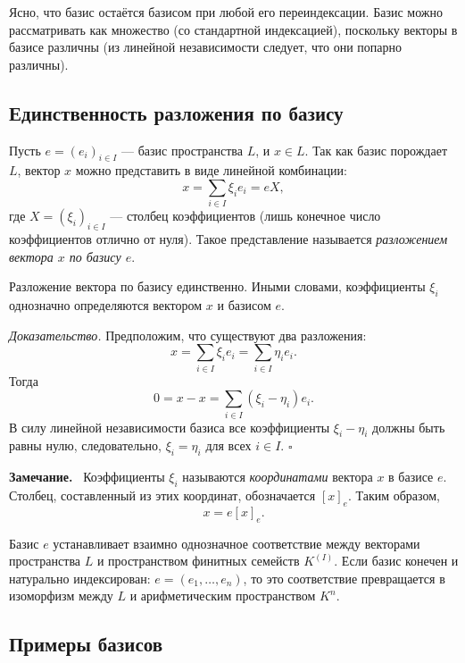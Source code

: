 \documentclass[a4paper,12pt]{article}
\newcommand{\myremark}{\textbf{Замечание.}\ }
\theoremstyle{definition}
\theoremstyle{plain}
\theoremstyle{remark}
\begin{document}
	Ясно, что базис остаётся базисом при любой его переиндексации. Базис можно рассматривать как множество (со стандартной индексацией), поскольку векторы в базисе различны (из линейной независимости следует, что они попарно различны).
	
	\subsection{Единственность разложения по базису}
	
	Пусть \( e = (e_i)_{i \in I} \) — базис пространства \( L \), и \( x \in L \). Так как базис порождает \( L \), вектор \( x \) можно представить в виде линейной комбинации:
	\[
	x = \sum_{i \in I} \xi_i e_i = eX,
	\]
	где \( X = (\xi_i)_{i \in I} \) — столбец коэффициентов (лишь конечное число коэффициентов отлично от нуля). Такое представление называется \textit{разложением вектора \( x \) по базису \( e \)}.
	
	\begin{tcolorbox}[colback=yellow!5, colframe=orange!50!black, title=Теорема (Единственность разложения)]
		Разложение вектора по базису единственно. Иными словами, коэффициенты \( \xi_i \) однозначно определяются вектором \( x \) и базисом \( e \).
	\end{tcolorbox}
	
	\medskip
	\textit{Доказательство.}
	Предположим, что существуют два разложения:
	\[
	x = \sum_{i \in I} \xi_i e_i = \sum_{i \in I} \eta_i e_i.
	\]
	Тогда
	\[
	0 = x - x = \sum_{i \in I} (\xi_i - \eta_i) e_i.
	\]
	В силу линейной независимости базиса все коэффициенты \( \xi_i - \eta_i \) должны быть равны нулю, следовательно, \( \xi_i = \eta_i \) для всех \( i \in I \). \hfill \(\square\)
	
	\myremark
	Коэффициенты \( \xi_i \) называются \textit{координатами} вектора \( x \) в базисе \( e \). Столбец, составленный из этих координат, обозначается \( [x]_e \). Таким образом,
	\[
	x = e [x]_e.
	\]
	
	Базис \( e \) устанавливает взаимно однозначное соответствие между векторами пространства \( L \) и пространством финитных семейств \( K^{(I)} \). Если базис конечен и натурально индексирован: \( e = (e_1, \dots, e_n) \), то это соответствие превращается в изоморфизм между \( L \) и арифметическим пространством \( K^n \).
	
	\subsection{Примеры базисов}
	
\end{document}
